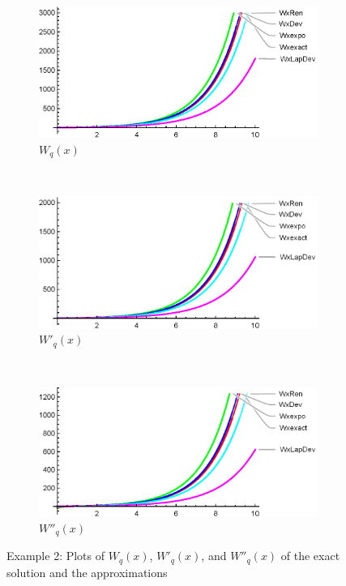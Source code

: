 \begin{figure}
    \centering
    \begin{subfigure}[b]{0.4\textwidth}
        \includegraphics[width=\textwidth]{Wsample2}
        \caption{$W_q(x)$}
        \label{fig:Wsample2}
    \end{subfigure}
    ~ %
    \begin{subfigure}[b]{0.4\textwidth}
        \includegraphics[width=\textwidth]{W1sample2}
        \caption{$W'_q(x)$}
        \label{fig:W1sample2}
    \end{subfigure}
    ~ %
    \\
    \begin{subfigure}[b]{0.9\textwidth}
        \includegraphics[width=\textwidth]{W2sample2}
        \caption{$W''_q(x)$}
        \label{fig:W2sample2}
    \end{subfigure}
    \caption{Example 2: Plots of $W_q(x)$, $W'_q(x)$, and $W''_q(x)$ of the exact solution and the approximations}\label{fig:sample2}
\end{figure}

